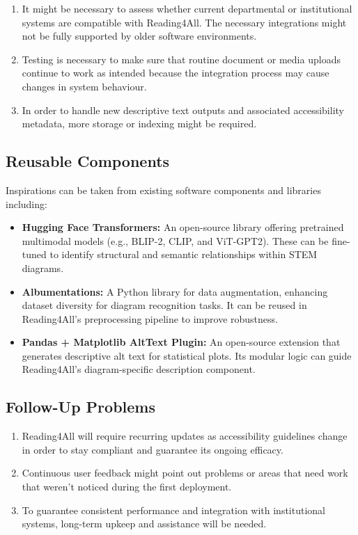 \documentclass[12pt]{article}
\begin{document}
\begin{enumerate}
    \item It might be necessary to assess whether current departmental or institutional systems are compatible with Reading4All. The necessary integrations might not be fully supported by older software environments.
    \item Testing is necessary to make sure that routine document or media uploads continue to work as intended because the integration process may cause changes in system behaviour.
    \item In order to handle new descriptive text outputs and associated accessibility metadata, more storage or indexing might be required.
\end{enumerate}

\subsection{Reusable Components}
Inspirations can be taken from existing software components and libraries including: 
\begin{itemize}
  \item \textbf{Hugging Face Transformers:} An open-source library
    offering pretrained multimodal models (e.g., BLIP-2, CLIP, and
    ViT-GPT2). These can be fine-tuned to identify structural and
    semantic relationships within STEM diagrams.

  \item \textbf{Albumentations:} A Python library for data
    augmentation, enhancing dataset diversity for diagram recognition
    tasks. It can be reused in Reading4All’s preprocessing pipeline
    to improve robustness.

  \item \textbf{Pandas + Matplotlib AltText Plugin:} An open-source
    extension that generates descriptive alt text for statistical
    plots. Its modular logic can guide Reading4All’s diagram-specific
    description component.
\end{itemize}

\subsection{Follow-Up Problems}

\begin{enumerate}
    \item Reading4All will require recurring updates as accessibility guidelines change in order to stay compliant and guarantee its ongoing efficacy.
    \item Continuous user feedback might point out problems or areas that need work that weren't noticed during the first deployment.
    \item To guarantee consistent performance and integration with institutional systems, long-term upkeep and assistance will be needed.
\end{enumerate}
\end{document}
